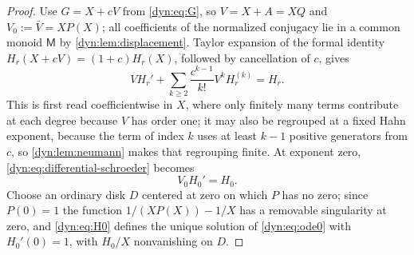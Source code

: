 \documentclass[11pt,letterpaper]{article}
\theoremstyle{definition}
\theoremstyle{remark}
\numberwithin{equation}{section}
\begin{document}
\begin{proof}
Use $G=X+cV$ from \eqref{dyn:eq:G}, so $V=X+A=XQ$ and
$V_0:=\bar V=XP(X)$; all coefficients of the normalized conjugacy lie in a
common monoid $\mathsf M$ by \cref{dyn:lem:displacement}. Taylor expansion
of the formal identity $H_r(X+cV)=(1+c)H_r(X)$, followed by cancellation of
$c$, gives
\begin{equation}\label{dyn:eq:differential-schroeder}
 VH_r'+\sum_{k\ge2}\frac{c^{k-1}}{k!}V^{k}H_r^{(k)}=H_r .
\end{equation}
This is first read coefficientwise in $X$, where only finitely many terms
contribute at each degree because $V$ has order one; it may also be
regrouped at a fixed Hahn exponent, because the term of index $k$ uses at
least $k-1$ positive generators from $c$, so \cref{dyn:lem:neumann} makes
that regrouping finite. At exponent zero,
\eqref{dyn:eq:differential-schroeder} becomes
\begin{equation}\label{dyn:eq:ode0}
 V_0H_0'=H_0 .
\end{equation}
Choose an ordinary disk $D$ centered at zero on which $P$ has no zero;
since $P(0)=1$ the function $1/(XP(X))-1/X$ has a removable singularity at
zero, and \eqref{dyn:eq:H0} defines the unique solution of
\eqref{dyn:eq:ode0} with $H_0'(0)=1$, with $H_0/X$ nonvanishing on $D$.


\end{proof}
\end{document}
